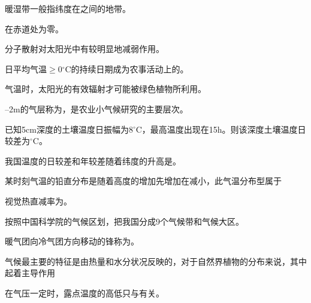 \documentclass[Tailscore,contitemcnt,answers]{nwsuafexam}%
\begin{document}
\begin{questions}
	    \question
	    暖湿带一般指纬度在\selectline 之间的地带。
	    
	    \question
	    在赤道处\selectline 为零。
	    
	    \question
	    分子散射对太阳光中\selectline 有较明显地减弱作用。
		
		\question
		日平均气温$\geqslant$0$^\circ$C的持续日期成为农事活动上的\selectline。
		
		\question
	    气温\selectline 时，太阳光的有效辐射才可能被绿色植物所利用。
		
		--2m的气层称为\selectline，是农业小气候研究的主要层次。
		
		\question
		已知5cm深度的土壤温度日振幅为8$^\circ$C，最高温度出现在15h。则该深度土壤温度日较差为\selectline $^\circ$C。
		
		\question
		我国温度的日较差和年较差随着纬度的升高是\selectline。
		
		\question
		某时刻气温的铅直分布是随着高度的增加先增加在减小，此气温分布型属于
		
		\question
		视觉热直减率为\selectline。
		
		\question
		按照中国科学院的气候区划，把我国分成9个气候带和\selectline 气候大区。
		
		\question
		暖气团向冷气团方向移动的锋称为\selectline。
		
		\question
		气候最主要的特征是由热量和水分状况反映的，对于自然界植物的分布来说，其中\selectline 起着主导作用
		
		\question
		在气压一定时，露点温度的高低只与\selectline 有关。
		

\end{questions}
\end{document}
